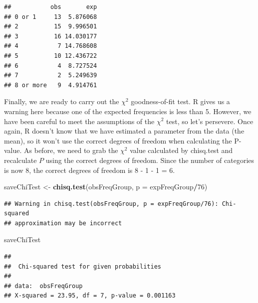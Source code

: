 \documentclass[]{article}
\newenvironment{Shaded}{\begin{snugshade}}{\end{snugshade}}
\newcommand{\CommentTok}[1]{\textcolor[rgb]{0.56,0.35,0.01}{\textit{#1}}}
\newcommand{\DataTypeTok}[1]{\textcolor[rgb]{0.13,0.29,0.53}{#1}}
\newcommand{\DecValTok}[1]{\textcolor[rgb]{0.00,0.00,0.81}{#1}}
\newcommand{\KeywordTok}[1]{\textcolor[rgb]{0.13,0.29,0.53}{\textbf{#1}}}
\newcommand{\NormalTok}[1]{#1}
\newcommand{\OperatorTok}[1]{\textcolor[rgb]{0.81,0.36,0.00}{\textbf{#1}}}
\newcommand{\StringTok}[1]{\textcolor[rgb]{0.31,0.60,0.02}{#1}}
\begin{document}
\begin{verbatim}
##           obs       exp
## 0 or 1     13  5.876068
## 2          15  9.996501
## 3          16 14.030177
## 4           7 14.768608
## 5          10 12.436722
## 6           4  8.727524
## 7           2  5.249639
## 8 or more   9  4.914761
\end{verbatim}

Finally, we are ready to carry out the \(\chi^2\) goodness-of-fit test.
R gives us a warning here because one of the expected frequencies is
less than 5. However, we have been careful to meet the assumptions of
the \(\chi^2\) test, so let's persevere. Once again, R doesn't know that
we have estimated a parameter from the data (the mean), so it won't use
the correct degrees of freedom when calculating the P-value. As before,
we need to grab the \(\chi^2\) value calculated by chisq.test and
recalculate \(P\) using the correct degrees of freedom. Since the number
of categories is now 8, the correct degrees of freedom is 8 - 1 - 1 = 6.

\begin{Shaded}
\begin{Highlighting}[]
\NormalTok{saveChiTest <-}\StringTok{ }\KeywordTok{chisq.test}\NormalTok{(obsFreqGroup, }\DataTypeTok{p =}\NormalTok{ expFreqGroup}\OperatorTok{/}\DecValTok{76}\NormalTok{)}
\end{Highlighting}
\end{Shaded}

\begin{verbatim}
## Warning in chisq.test(obsFreqGroup, p = expFreqGroup/76): Chi-squared
## approximation may be incorrect
\end{verbatim}

\begin{Shaded}
\begin{Highlighting}[]
\NormalTok{saveChiTest }
\end{Highlighting}
\end{Shaded}

\begin{verbatim}
## 
##  Chi-squared test for given probabilities
## 
## data:  obsFreqGroup
## X-squared = 23.95, df = 7, p-value = 0.001163
\end{verbatim}

\begin{Shaded}
\end{Shaded}
\end{document}
